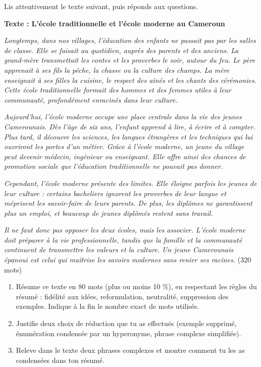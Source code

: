 \documentclass[11pt]{article}
\begin{document}
\begin{exercice}
Lis attentivement le texte suivant, puis réponds aux questions.

\textbf{Texte : L'école traditionnelle et l'école moderne au Cameroun}

\emph{Longtemps, dans nos villages, l'éducation des enfants ne passait pas par les salles de classe. Elle se faisait au quotidien, auprès des parents et des anciens. La grand-mère transmettait les contes et les proverbes le soir, autour du feu. Le père apprenait à ses fils la pêche, la chasse ou la culture des champs. La mère enseignait à ses filles la cuisine, le respect des aînés et les chants des cérémonies. Cette école traditionnelle formait des hommes et des femmes utiles à leur communauté, profondément enracinés dans leur culture.}

\emph{Aujourd'hui, l'école moderne occupe une place centrale dans la vie des jeunes Camerounais. Dès l'âge de six ans, l'enfant apprend à lire, à écrire et à compter. Plus tard, il découvre les sciences, les langues étrangères et les techniques qui lui ouvriront les portes d'un métier. Grâce à l'école moderne, un jeune du village peut devenir médecin, ingénieur ou enseignant. Elle offre ainsi des chances de promotion sociale que l'éducation traditionnelle ne pouvait pas donner.}

\emph{Cependant, l'école moderne présente des limites. Elle éloigne parfois les jeunes de leur culture : certains bacheliers ignorent les proverbes de leur langue et méprisent les savoir-faire de leurs parents. De plus, les diplômes ne garantissent plus un emploi, et beaucoup de jeunes diplômés restent sans travail.}

\emph{Il ne faut donc pas opposer les deux écoles, mais les associer. L'école moderne doit préparer à la vie professionnelle, tandis que la famille et la communauté continuent de transmettre les valeurs et la culture. Un jeune Camerounais épanoui est celui qui maîtrise les savoirs modernes sans renier ses racines.} (320 mots)

\begin{enumerate}
\item Résume ce texte en 80 mots (plus ou moins 10 \%), en respectant les règles du résumé : fidélité aux idées, reformulation, neutralité, suppression des exemples. Indique à la fin le nombre exact de mots utilisés.
\item Justifie deux choix de réduction que tu as effectués (exemple supprimé, énumération condensée par un hyperonyme, phrase complexe simplifiée).
\item Releve dans le texte deux phrases complexes et montre comment tu les as condensées dans ton résumé.
\end{enumerate}
\end{exercice}
\end{document}
